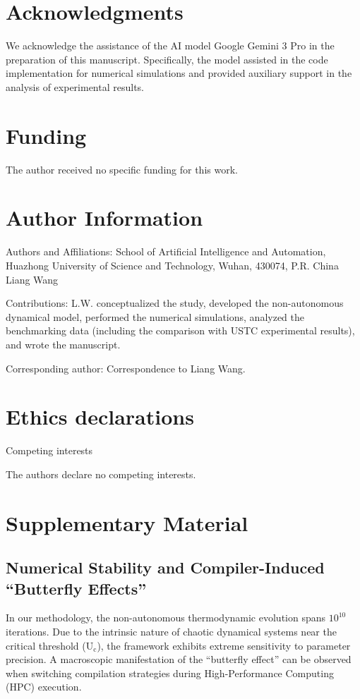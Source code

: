 \documentclass[fleqn,10pt]{wlscirep}
\begin{document}
\section*{Acknowledgments}

We acknowledge the assistance of the AI model Google Gemini 3 Pro in the
preparation of this manuscript. Specifically, the model assisted in the
code implementation for numerical simulations and provided auxiliary
support in the analysis of experimental results.

\section*{Funding}

The author received no specific funding for this work.

\section*{Author Information}

Authors and Affiliations: School of Artificial Intelligence and
Automation, Huazhong University of Science and Technology, Wuhan,
430074, P.R. China Liang Wang

Contributions: L.W. conceptualized the study, developed the
non-autonomous dynamical model, performed the numerical simulations,
analyzed the benchmarking data (including the comparison with USTC
experimental results), and wrote the manuscript.

Corresponding author: Correspondence to Liang Wang.

\section*{Ethics declarations}

Competing interests

The authors declare no competing interests.

\section*{Supplementary Material}

\subsection*{Numerical Stability and Compiler-Induced ``Butterfly Effects''}

In our methodology, the non-autonomous thermodynamic evolution spans
\(\text{10}^{\text{10}}\) iterations. Due to the intrinsic nature of
chaotic dynamical systems near the critical threshold
(\(\text{U}_{\text{c}}\)), the framework exhibits extreme sensitivity to
parameter precision. A macroscopic manifestation of the ``butterfly
effect'' can be observed when switching compilation strategies during
High-Performance Computing (HPC) execution.
\end{document}
